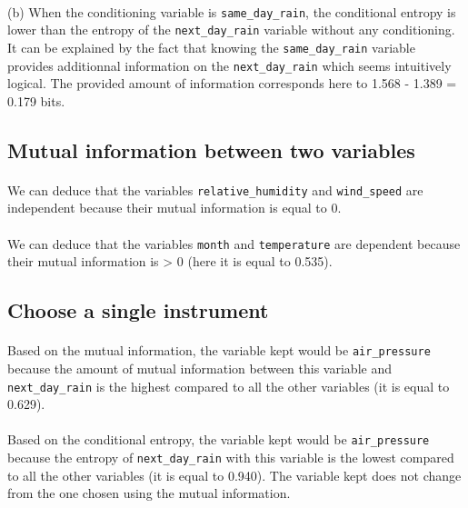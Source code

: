 \documentclass[a4paper, 11pt, oneside]{article}
\begin{document}
\paragraph{}(b) When the conditioning variable is \texttt{same\_day\_rain}, the conditional entropy is lower than the entropy of the \texttt{next\_day\_rain} variable without any conditioning.
It can be explained by the fact that knowing the \texttt{same\_day\_rain} variable provides additionnal information on the \texttt{next\_day\_rain} which seems intuitively logical. The provided amount of information corresponds here to 1.568 - 1.389 = 0.179 bits.

\subsection{Mutual information between two variables} 

\paragraph{}We can deduce that the variables \texttt{relative\_humidity} and \texttt{wind\_speed} are independent because their mutual information is equal to 0. 

\paragraph{}We can deduce that the variables \texttt{month} and \texttt{temperature} are dependent because their mutual information is > 0 (here it is equal to 0.535).

\subsection{Choose a single instrument}

\paragraph{}Based on the mutual information, the variable kept would be \texttt{air\_pressure} because the amount of mutual information between this variable and \texttt{next\_day\_rain} is the highest compared to all the other variables (it is equal to 0.629).

\paragraph{}Based on the conditional entropy, the variable kept would be \texttt{air\_pressure} because the entropy of \texttt{next\_day\_rain} with this variable is the lowest compared to all the other variables (it is equal to 0.940). The variable kept does not change from the one chosen using the mutual information.
\end{document}
